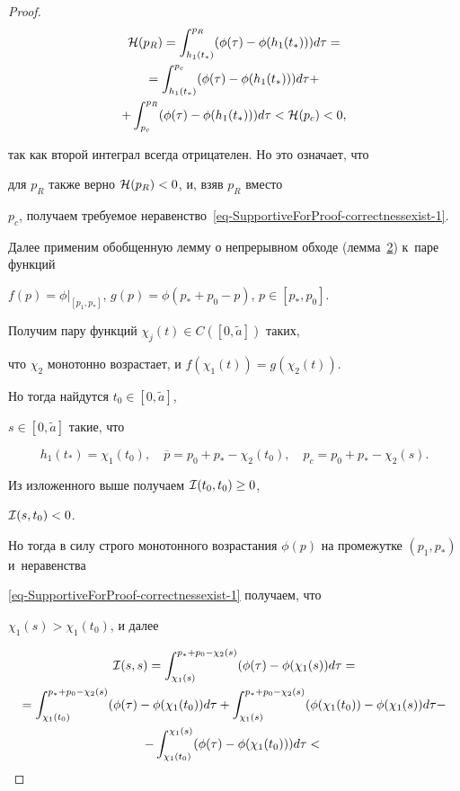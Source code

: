 \begin{proof}
\begin{multline}
{\cal

H}(p_R)=\int _{h_1(t_*)}^{p_R}(\phi(\tau)-\phi(h_1(t_*)))d\tau=

\\

=\int _{h_1(t_*)}^{p_c}(\phi(\tau)-\phi(h_1(t_*)))d\tau+ \\ +\int _{p_c}^{p_R}(\phi(\tau)-\phi(h_1(t_*)))d\tau<{\cal

H}(p_c)<0,

\end{multline}

так как второй интеграл всегда отрицателен. Но это означает, что

для $p_R$ также верно ${\cal H}(p_R)<0$, и, взяв $p_R$ вместо

$p_c$, получаем требуемое неравенство~\eqref{eq-SupportiveForProof-correctnessexist-1}.



Далее применим обобщенную лемму о непрерывном обходе (лемма~\hyperlink{palin:lemma2}{2}) к~паре функций

$f(p)=\phi|_{[p_1,p_*]}$, $g(p)=\phi(p_*+p_0-p)$, $p\in[p_*,p_0]$.

Получим пару функций $\chi_j(t)\in C([0,\widetilde{a}])$ таких,

что $\chi_2$ монотонно возрастает, и $f(\chi_1(t))=g(\chi_2(t))$.

Но тогда найдутся $t_0\in[0,\widetilde{a}]$,

$s\in[0,\widetilde{a}]$ такие, что 

$$h_1(t_*)=\chi_1(t_0),\quad \overline{p}=p_0+p_*-\chi_2(t_0),\quad  p_c=p_0+p_*-\chi_2(s).$$

Из изложенного выше получаем ${\cal I}(t_0,t_0)\ge0$,

${\cal I}(s,t_0)<0$. 

Но тогда в силу строго монотонного возрастания $\phi(p)$ на промежутке $(p_1,p_*)$ и~неравенства

\eqref{eq-SupportiveForProof-correctnessexist-1} получаем, что

$\chi_1(s)>\chi_1(t_0)$, и далее

\begin{multline}

{\cal

I}(s,s)=\int _{\chi_1(s)}^{p_*+p_0-\chi_2(s)}(\phi(\tau)-\phi(\chi_1(s))d\tau= \\ =\int _{\chi_1(t_0)}^{p_*+p_0-\chi_2(s)}(\phi(\tau)-\phi(\chi_1(t_0))d\tau

+\int _{\chi_1(s)}^{p_*+p_0-\chi_2(s)}(\phi(\chi_1(t_0))-\phi(\chi_1(s))d\tau - \\-\int _{\chi_1(t_0)}^{\chi_1(s)}(\phi(\tau)-\phi(\chi_1(t_0)))d\tau<{\cal

}
\end{multline}
\end{proof}
